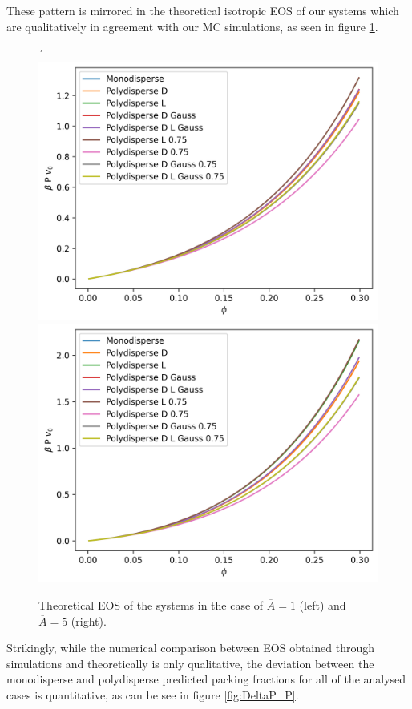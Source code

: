\documentclass[journal=jacsat,manuscript=article]{achemso}
\begin{document}
These pattern is mirrored in the theoretical isotropic EOS of our systems which are qualitatively in agreement with our MC simulations, as seen in figure \ref{fig:TH_EOS}.

\begin{figure}[!h]
	\centering
´	\includegraphics[width=0.45 \columnwidth]{Figures/EOS_TH_A1.png}
	\includegraphics[width=0.45 \columnwidth]{Figures/EOS_TH_A5.png}
	\caption{Theoretical EOS of the systems in the case of $\overline{A} = 1$ (left) and $\overline{A} = 5$ (right).}
	\label{fig:TH_EOS}
\end{figure}

Strikingly, while the numerical comparison between EOS obtained through simulations and theoretically is only qualitative, the deviation between the monodisperse and polydisperse predicted packing fractions for all of the analysed cases is quantitative, as can be see in figure \ref{fig:DeltaP_P}. 
\end{document}
